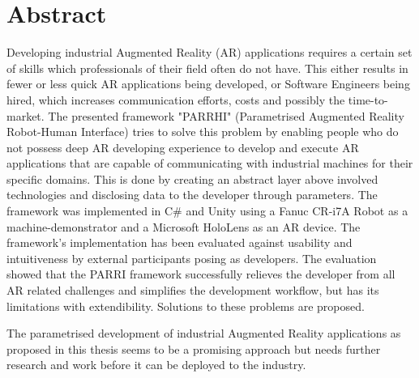 \chapter*{Abstract}\label{Chap:Abstract}

Developing industrial Augmented Reality (AR) applications requires a certain set of skills which professionals of their field often do not have. This either results in fewer or less quick AR applications being developed, or Software Engineers being hired, which increases communication efforts, costs and possibly the time-to-market. The presented framework "PARRHI" (Parametrised Augmented Reality Robot-Human Interface) tries to solve this problem by enabling people who do not possess deep AR developing experience to develop and execute AR applications that are capable of communicating with industrial machines for their specific domains. This is done by creating an abstract layer above involved technologies and disclosing data to the developer through parameters. The framework was implemented in C\# and Unity using a Fanuc CR-i7A Robot as a machine-demonstrator and a Microsoft HoloLens as an AR device. The framework's implementation has been evaluated against usability and intuitiveness by external participants posing as developers. The evaluation showed that the PARRI framework successfully relieves the developer from all AR related challenges and simplifies the development workflow, but has its limitations with extendibility. Solutions to these problems are proposed. 

The parametrised development of industrial Augmented Reality applications as proposed in this thesis seems to be a promising approach but needs further research and work before it can be deployed to the industry.